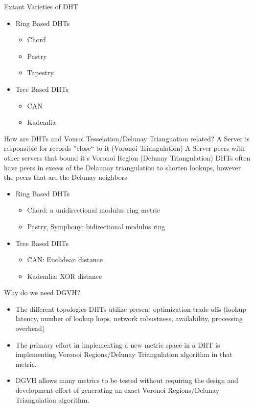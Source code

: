 \documentclass[8pt]{beamer}
\begin{document}
\begin{frame}{Extant Varieties of DHT}
	\begin{itemize}
		\item Ring Based DHTs
		\begin{itemize}
			\item Chord
			\item Pastry
			\item Tapestry
		\end{itemize}
		\item Tree Based DHTs
		\begin{itemize}
			\item CAN
			\item Kademlia
		\end{itemize}
	\end{itemize}
\end{frame}

\begin{frame}{How are DHTs and Vonroi Tesselation/Delunay Trianguation related?}
	A Server is responsible for records ''close`` to it (Voronoi Triangulation)
	A Server peers with other servers that bound it's Voronoi Region (Delunay Triangulation)
	DHTs often have peers in excess of the Delaunay triangulation to shorten lookups, however the peers that are the Delunay neighbors
	\begin{itemize}
		\item Ring Based DHTs
		\begin{itemize}
			\item Chord: a unidirectional modulus ring metric
			\item Pastry, Symphony: bidirectional modulus ring
		\end{itemize}
		\item Tree Based DHTs
		\begin{itemize}
			\item CAN: Euclidean distance
			\item Kademlia: XOR distance
		\end{itemize}
	\end{itemize}
\end{frame}


\begin{frame}{Why do we need DGVH?}
	\begin{itemize}
		\item The different topologies DHTs utilize present optimization trade-offs (lookup latency, number of lookup hops, network robustness, availability, processing overhead)
		\item The primary effort in implementing a new metric space in a DHT is implementing Voronoi Regions/Delunay Triangulation algorithm in that metric.
		\item DGVH allows many metrics to be tested without requiring the design and development effort of generating an exact Voronoi Regions/Delunay Triangulation algorithm.
		
	\end{itemize}
\end{frame}
\end{document}
